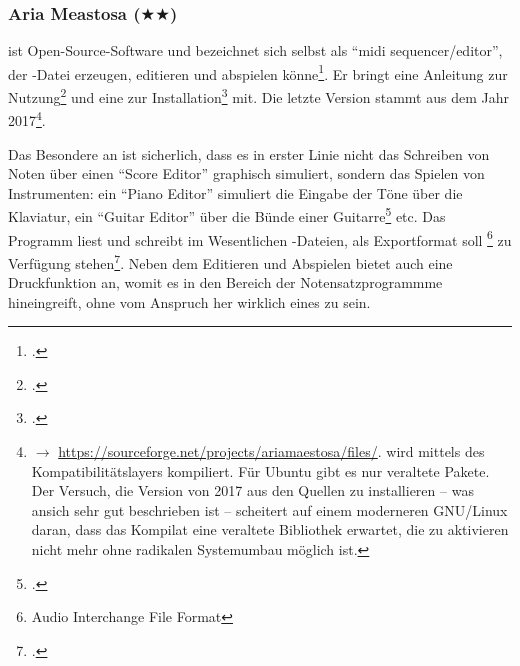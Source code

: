 %
%
%



\subsubsection{Aria Meastosa ($\bigstar$$\bigstar$)}

\label{AriaMaestosa} ist Open-Source-Software und bezeichnet
sich selbst als  \enquote{midi sequencer/editor}, der -Datei erzeugen,
editieren und abspielen könne\footcite[vgl.][\nopage wp]{AriaMaestosa2017a}. Er
bringt eine Anleitung zur Nutzung\footcite[vgl.][\nopage wp]{AriaMaestosa2017b}
und eine zur Installation\footcite[vgl.][\nopage wp]{AriaMaestosa2017c} mit. Die
letzte Version stammt aus dem Jahr 2017\footnote{$\rightarrow$
\href{https://sourceforge.net/projects/ariamaestosa/files/}
{https://sourceforge.net/projects/ariamaestosa/files/}.  wird
mittels des Kompatibilitätslayers  kompiliert. Für Ubuntu gibt es
nur veraltete Pakete. Der Versuch, die Version von 2017 aus den Quellen zu
installieren -- was ansich sehr gut beschrieben ist -- scheitert auf einem
mo\-der\-ne\-ren GNU/Linux daran, dass das Kompilat eine veraltete Bibliothek
erwartet, die zu aktivieren nicht mehr ohne radikalen Systemumbau möglich ist.}.

Das Besondere an  ist sicherlich, dass es in erster Linie
nicht das Schreiben von Noten über einen \enquote{Score Editor} graphisch
simuliert, sondern das Spielen von Instrumenten: ein \enquote{Piano Editor}
simuliert die Eingabe der Töne über die Klaviatur, ein \enquote{Guitar
Editor} über die Bünde einer Guitarre\footcite[vgl.][\nopage
wp]{AriaMaestosa2017b} etc. Das Programm liest und schreibt im Wesentlichen
-Dateien, als Exportformat soll \footnote{Audio Interchange
File Format} zu Verfügung stehen\footcite[vgl.][\nopage wp]{Guepewi2017a}. Neben
dem Editieren und Abspielen bietet  auch eine
Druckfunktion an, womit es in den Bereich der Notensatzprogrammme hineingreift,
ohne vom Anspruch her wirklich eines zu sein.


